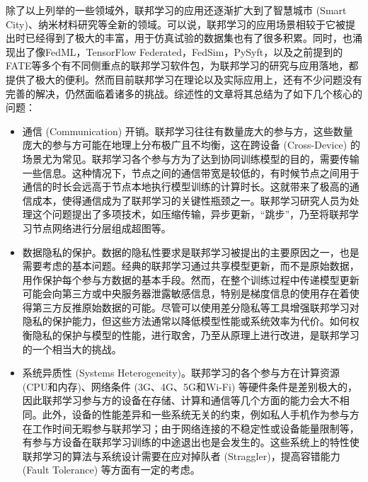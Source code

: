 除了以上列举的一些领域外，联邦学习的应用还逐渐扩大到了智慧城市 (Smart City)\cite{Zheng_2021_fl_smart_city}、纳米材料研究\cite{Huang_2022_fl_physics}等全新的领域。可以说，联邦学习的应用场景相较于它被提出时已经得到了极大的丰富，用于仿真试验的数据集也有了很多积累。同时，也涌现出了像FedML\cite{he_2020_fedml}，TensorFlow Federated\cite{tensorflow}，FedSim\cite{wu_2021_fedsim}，PySyft\cite{ryffel_2018_pysyft}，以及之前提到的FATE\cite{liu_2021_fate_fl}等多个有不同侧重点的联邦学习软件包，为联邦学习的研究与应用落地，都提供了极大的便利。然而目前联邦学习在理论以及实际应用上，还有不少问题没有完善的解决，仍然面临着诸多的挑战\cite{kairouz2019advances_fl, Li_2020_fl_challenges}。综述性的文章\parencite{Li_2020_fl_challenges, Wu_2020_iot_fl}将其总结为了如下几个核心的问题：
\begin{itemize}
\item 通信 (Communication) 开销。联邦学习往往有数量庞大的参与方，这些数量庞大的参与方可能在地理上分布极广且不均衡，这在跨设备 (Cross-Device) 的场景尤为常见。联邦学习各个参与方为了达到协同训练模型的目的，需要传输一些信息。这种情况下，节点之间的通信带宽是较低的，有时候节点之间用于通信的时长会远高于节点本地执行模型训练的计算时长。这就带来了极高的通信成本，使得通信成为了联邦学习的关键性瓶颈之一。联邦学习研究人员为处理这个问题提出了多项技术，如压缩传输\cite{seide2014_1bitsgd}，异步更新\cite{tran2021feddr}，``跳步''\cite{proxskip, zhang2020fedpd}，乃至将联邦学习节点网络进行分层组成超图\cite{t2020pfedme}等。
\item 数据隐私的保护。数据的隐私性要求是联邦学习被提出的主要原因之一，也是需要考虑的基本问题。经典的联邦学习通过共享模型更新，而不是原始数据，用作保护每个参与方数据的基本手段。然而，在整个训练过程中传递模型更新可能会向第三方或中央服务器泄露敏感信息，特别是梯度信息的使用存在着使得第三方反推原始数据的可能\cite{zhu2019deep_leakage}。尽管可以使用差分隐私\cite{Dwork_2008_DP}等工具增强联邦学习对隐私的保护能力，但这些方法通常以降低模型性能或系统效率为代价。如何权衡隐私的保护与模型的性能，进行取舍，乃至从原理上进行改进，是联邦学习的一个相当大的挑战。
\item 系统异质性 (Systems Heterogeneity)。联邦学习的各个参与方在计算资源 (CPU和内存)、网络条件 (3G、4G、5G和Wi-Fi) 等硬件条件是差别极大的，因此联邦学习参与方的设备在存储、计算和通信等几个方面的能力会大不相同。此外，设备的性能差异和一些系统无关的约束，例如私人手机作为参与方在工作时间无暇参与联邦学习；由于网络连接的不稳定性或设备能量限制等，有参与方设备在联邦学习训练的中途退出也是会发生的。这些系统上的特性使联邦学习的算法与系统设计需要在应对掉队者 (Straggler)，提高容错能力 (Fault Tolerance) 等方面有一定的考虑。

\end{itemize}
